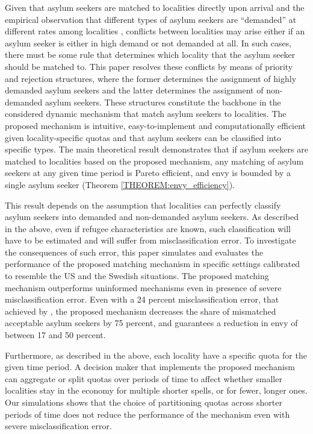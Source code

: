 \documentclass[12pt,fleqn]{article}
\begin{document}
Given that asylum seekers are matched to localities directly upon arrival and the empirical observation that different types of asylum seekers are ``demanded'' at different rates among localities \citep{bib:BansakEtAl}, conflicts between localities may arise either if an asylum seeker is either in high demand or not demanded at all. In such cases, there must be some rule that determines which locality that the asylum seeker should be matched to. This paper resolves these conflicts by means of priority and rejection structures, where the former determines the assignment of highly demanded asylum seekers and the latter determines the assignment of non-demanded asylum seekers. These structures constitute the backbone in the considered dynamic mechanism that match asylum seekers to localities. The proposed mechanism is intuitive, easy-to-implement and computationally efficient given locality-specific quotas and that asylum seekers can be classified into specific types. The main theoretical result demonstrates that if asylum seekers are matched to localities based on the proposed mechanism, any matching of asylum seekers at any given time period is Pareto efficient, and envy is bounded by a single asylum seeker (Theorem \ref{THEOREM:envy_efficiency}). 

This result depends on the assumption that localities can perfectly classify asylum seekers into demanded and non-demanded asylum seekers. As described in the above, even if refugee characteristics are known, such classification will have to be estimated and will suffer from misclassification error. To investigate the consequences of such error, this paper simulates and evaluates the performance of the proposed matching mechanism in specific settings calibrated to resemble the US and the Swedish situations. The proposed matching mechanism outperforms uninformed mechanisms even in presence of severe misclassification error. Even with a 24 percent misclassification error, that achieved by \citep{bib:BansakEtAl}, the proposed mechanism decreases the share of mismatched acceptable asylum seekers by 75 percent, and guarantees a reduction in envy of between 17 and 50 percent.

Furthermore, as described in the above, each locality have a specific quota for the given time period. A decision maker that implements the proposed mechanism can aggregate or split quotas over periods of time to affect whether smaller localities stay in the economy for multiple shorter spells, or for fewer, longer ones. Our simulations shows that the choice of partitioning quotas across shorter periods of time does not reduce the performance of the mechanism even with severe misclassification error.
\end{document}
